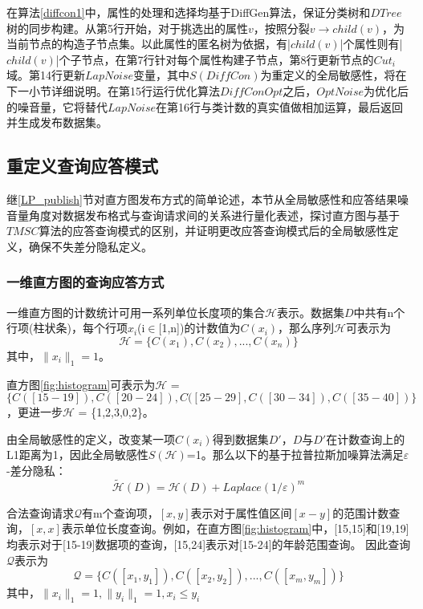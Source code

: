 在算法\ref{diffcon1}中，属性的处理和选择均基于DiffGen算法，保证分类树和$DTree$树的同步构建。从第5行开始，对于挑选出的属性$v$，按照分裂$v$$\rightarrow$$child(v)$，为当前节点的构造子节点集。以此属性的匿名树为依据，有|$child(v)$|个属性则有|$child(v)$|个子节点，在第7行针对每个属性构建子节点，第8行更新节点的$Cut_{i}$域。第14行更新$LapNoise$变量，其中$S(DiffCon)$为重定义的全局敏感性，将在下一小节详细说明。在第15行运行优化算法$DiffConOpt$之后，$OptNoise$为优化后的噪音量，它将替代$LapNoise$在第16行与类计数的真实值做相加运算，最后返回并生成发布数据集。

\subsection{重定义查询应答模式}

继\ref{LP_publish}节对直方图发布方式的简单论述，本节从全局敏感性和应答结果噪音量角度对数据发布格式与查询请求间的关系进行量化表述，探讨直方图与基于$TMSC$算法的应答查询模式的区别，并证明更改应答查询模式后的全局敏感性定义，确保不失差分隐私定义。

\subsubsection{一维直方图的查询应答方式}

一维直方图的计数统计可用一系列单位长度项的集合$\mathcal{H}$表示。数据集$D$中共有n个行项(柱状条)，每个行项$x_{i}$(i$\in$[1,n])的计数值为$C(x_{i})$，那么序列$\mathcal{H}$可表示为
\begin{equation*}
	\mathcal{H} = \{C(x_{1}),C(x_{2}),...,C(x_{n})\}
\end{equation*}
其中，$\|x_{i}\|_{1} = 1$。

\begin{exmp}
	\label{chap4_exmp}
	直方图\ref{fig:histogram}可表示为$\mathcal{H}$ = $\{C([15-19]),C([20-24]),C([25-29],C([30-34]),C([35-40])\}$，更进一步$\mathcal{H}$ = \{1,2,3,0,2\}。
\end{exmp}

由全局敏感性的定义，改变某一项$C(x_{i})$得到数据集$D'$，$D$与$D'$在计数查询上的L1距离为1，因此全局敏感性$S(\mathcal{H})$=1。那么以下的基于拉普拉斯加噪算法满足$\varepsilon$-差分隐私：
\begin{equation}
	\label{chap4_lap}
	\tilde{\mathcal{H}}(D) = \mathcal{H}(D) + \textit{Laplace}(1/\varepsilon)^m
\end{equation}

合法查询请求$\mathcal{Q}$有m个查询项，$[x,y]$表示对于属性值区间$[x-y]$的范围计数查询，$[x,x]$表示单位长度查询。例如，在直方图\ref{fig:histogram}中，[15,15]和[19,19]均表示对于[15-19]数据项的查询，[15,24]表示对[15-24]的年龄范围查询。
因此查询$\mathcal{Q}$表示为
\[
	 \mathcal{Q} = \{C([x_{1},y_{1}]),C([x_{2},y_{2}]),...,C([x_{m},y_{m}])\}
\]
其中，$\|x_{i}\|_{1} = 1, \|y_{i}\|_{1} = 1, x_{i} \leqslant y_{i}$

